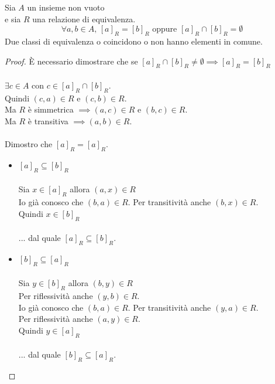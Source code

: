 \documentclass[a4paper,12pt, oneside]{book}
\begin{document}
	\begin{teorema}
		Sia $A$ un insieme non vuoto\\
		e sia $R$ una relazione di equivalenza.
		$$\forall a,b \in A \mbox{, } [a]_{R} = [b]_{R} \mbox{ oppure } [a]_{R} \cap [b]_{R} = \emptyset$$
		Due classi  di equivalenza o coincidono o non hanno elementi in comune.
		\begin{proof}
			È necessario dimostrare che se $[a]_{R} \cap [b]_{R} \not = \emptyset \implies [a]_{R} = [b]_{R}$\\\\
			
			$\exists c \in A$ con $c \in [a]_{R} \cap [b]_{R}$.\\
			Quindi $(c,a) \in R$ e $(c,b) \in R$.\\
			Ma $R$ è simmetrica $\implies (a,c) \in R$ e $(b,c) \in R$.\\
			Ma $R$ è transitiva $\implies (a,b) \in R$.\\\\
			
			Dimostro che $[a]_{R} = [a]_{R}$.\\
			\begin{itemize}
				\item $[a]_{R} \subseteq [b]_{R}$\\\\
					Sia $x \in [a]_{R}$ allora $(a,x) \in R$\\
					Io già conosco che $(b,a) \in R$. Per transitività anche $(b,x) \in R$.\\
					 Quindi $x \in [b]_{R}$\\\\
					 ... dal quale $[a]_{R} \subseteq [b]_{R}$.
				\item $[b]_{R} \subseteq [a]_{R}$\\\\
					Sia $y \in [b]_{R}$ allora $(b,y) \in R$\\
					Per riflessività anche $(y,b) \in R$.\\
					Io già conosco che $(b,a) \in R$. Per transitività anche $(y,a) \in R$.\\
					Per riflessività anche $(a,y) \in R$.\\
					Quindi $y \in [a]_{R}$\\\\
					... dal quale $[b]_{R} \subseteq [a]_{R}$.
			\end{itemize}
		\end{proof}
	\end{teorema}
	
\end{document}
